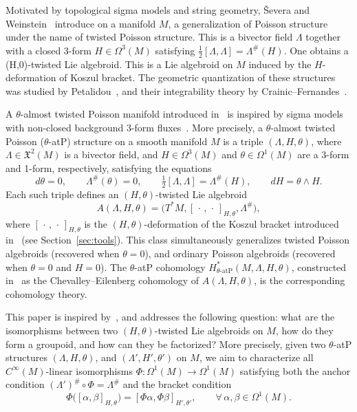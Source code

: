 \documentclass[11pt,a4paper]{article}
\theoremstyle{plain}
\theoremstyle{definition}
\theoremstyle{remark}
\begin{document}
Motivated by topological sigma models and string
geometry, \v{S}evera and Weinstein~\cite{SeveraWeinstein2001} introduce on a manifold $M$, a  generalization of Poisson structure   under the name of twisted Poisson structure. This is  a bivector field $\Lambda$ together with   a closed 3-form $H\in\Omega^{3}(M)$
satisfying $
\frac{1}{2}[\Lambda,\Lambda]=\Lambda^{\#}(H).
$
One obtains a  (H,0)-twisted  Lie algebroid. This is a Lie algebroid  on $M$ induced by the $H$-deformation of  Koszul bracket.
The geometric quantization of these structures was studied by
Petalidou~\cite{Petalidou2007}, and their integrability theory by
Crainic--Fernandes~\cite{CrainicFernandes2003}.

A $\theta$-almost twisted Poisson manifold introduced in~\cite{NansidiTangueDongho2025b}
is inspired by sigma models with non-closed background 3-form fluxes~\cite{Chatzistavrakidis2020}.
More precisely, a $\theta$-almost twisted Poisson ($\theta$-atP) structure on a smooth manifold $M$
is a triple $(\Lambda,H,\theta)$, where $\Lambda\in \mathfrak{X}^{2}(M)$ is a bivector field,
and $H\in\Omega^{3}(M)$ and $\theta\in\Omega^{1}(M)$ are a 3-form and 1-form, respectively,
satisfying the equations
\begin{equation*}
	d\theta=0,\qquad
	\Lambda^{\#}(\theta)=0,\qquad
	\tfrac{1}{2}[\Lambda,\Lambda]=\Lambda^{\#}(H),\qquad
	dH=\theta\wedge H.
\end{equation*}
Each such triple defines an $(H,\theta)$-twisted Lie algebroid
$$
A(\Lambda,H,\theta)=\bigl(T^*M,[\,\cdot\,,\,\cdot\,]_{H,\theta},\Lambda^{\#}\bigr),
$$
where $[\,\cdot\,,\,\cdot\,]_{H,\theta}$ is the $(H,\theta)$-deformation of the
Koszul bracket introduced in~\cite{NansidiTangueDongho2025b} (see Section~\ref{sec:tools}).
This class simultaneously generalizes twisted Poisson algebroids (recovered when $\theta=0$),
and ordinary Poisson algebroids (recovered when $\theta=0$ and $H=0$).
The $\theta$-atP cohomology $H^{\ast}_{\theta\text{-atP}}(M,\Lambda,H,\theta)$,
constructed in~\cite{NansidiTangueDongho2025b} as the Chevalley--Eilenberg cohomology of
$A(\Lambda,H,\theta)$, is the corresponding cohomology theory.

This paper is inspired by~\cite{TNB2},  and addresses the following question:
what are the isomorphisms between two $(H,\theta)$-twisted Lie algebroids on $M$,
how do they form a groupoid, and how can they be factorized?
More precisely, given two $\theta$-atP structures $(\Lambda,H,\theta)$,  and
$(\Lambda',H',\theta')$ on $M$, we aim to characterize all $C^{\infty}(M)$-linear
isomorphisms $\Phi:\Omega^{1}(M)\to\Omega^{1}(M)$ satisfying both the anchor
condition $
(\Lambda')^{\#}\circ\Phi=\Lambda^{\#}
$
and the bracket condition
$$
\Phi\bigl([\alpha,\beta]_{H,\theta}\bigr)
=
[\Phi\alpha,\Phi\beta]_{H',\theta'},
\qquad \forall\,\alpha,\beta\in\Omega^{1}(M).
$$
\end{document}
